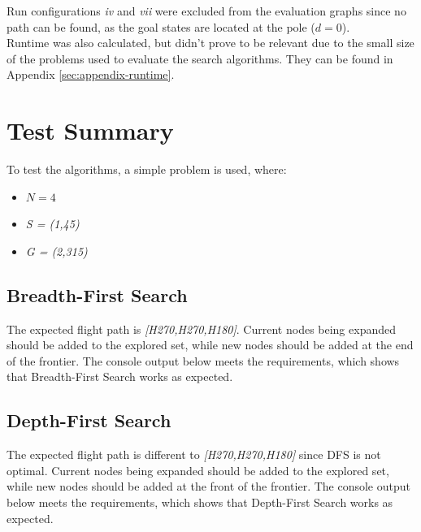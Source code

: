 \documentclass[letterpaper,12pt]{article}
\begin{document}
Run configurations \textit{iv} and \textit{vii} were excluded from the evaluation graphs since no path can be found, as the goal states are located at the pole ($d=0$).\\

Runtime was also calculated, but didn't prove to be relevant due to the small size of the problems used to evaluate the search algorithms. They can be found in Appendix \ref{sec:appendix-runtime}.

\section{Test Summary}
\label{sec:test-summary}

To test the algorithms, a simple problem is used, where:
\begin{itemize}
    \item $N=4$
    \item \textit{S = (1,45)}
    \item \textit{G = (2,315)}
\end{itemize}

\subsection{Breadth-First Search}

The expected flight path is \textit{[H270,H270,H180]}. Current nodes being expanded should be added to the explored set, while new nodes should be added at the end of the frontier. The console output below meets the requirements, which shows that Breadth-First Search works as expected.



\subsection{Depth-First Search}

The expected flight path is different to \textit{[H270,H270,H180]} since DFS is not optimal. Current nodes being expanded should be added to the explored set, while new nodes should be added at the front of the frontier. The console output below meets the requirements, which shows that Depth-First Search works as expected.


\end{document}
